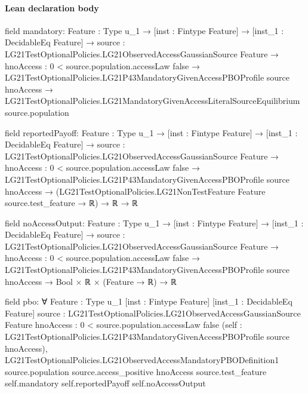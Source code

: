 \documentclass[10pt]{article}
\begin{document}
\paragraph{Lean declaration body}
\begin{ReviewVerbatim}
field mandatory:
{Feature : Type u_1} →
  [inst : Fintype Feature] →
    [inst_1 : DecidableEq Feature] →
      {source : LG21TestOptionalPolicies.LG21ObservedAccessGaussianSource Feature} →
        {hnoAccess : 0 < source.population.accessLaw {false}} →
          LG21TestOptionalPolicies.LG21P43MandatoryGivenAccessPBOProfile source hnoAccess →
            LG21TestOptionalPolicies.LG21MandatoryGivenAccessLiteralSourceEquilibrium source.population

field reportedPayoff:
{Feature : Type u_1} →
  [inst : Fintype Feature] →
    [inst_1 : DecidableEq Feature] →
      {source : LG21TestOptionalPolicies.LG21ObservedAccessGaussianSource Feature} →
        {hnoAccess : 0 < source.population.accessLaw {false}} →
          LG21TestOptionalPolicies.LG21P43MandatoryGivenAccessPBOProfile source hnoAccess →
            (LG21TestOptionalPolicies.LG21NonTestFeature Feature source.test_feature → ℝ) → ℝ → ℝ

field noAccessOutput:
{Feature : Type u_1} →
  [inst : Fintype Feature] →
    [inst_1 : DecidableEq Feature] →
      {source : LG21TestOptionalPolicies.LG21ObservedAccessGaussianSource Feature} →
        {hnoAccess : 0 < source.population.accessLaw {false}} →
          LG21TestOptionalPolicies.LG21P43MandatoryGivenAccessPBOProfile source hnoAccess → Bool × ℝ × (Feature → ℝ) → ℝ

field pbo:
∀ {Feature : Type u_1} [inst : Fintype Feature] [inst_1 : DecidableEq Feature]
  {source : LG21TestOptionalPolicies.LG21ObservedAccessGaussianSource Feature}
  {hnoAccess : 0 < source.population.accessLaw {false}}
  (self : LG21TestOptionalPolicies.LG21P43MandatoryGivenAccessPBOProfile source hnoAccess),
  LG21TestOptionalPolicies.LG21ObservedAccessMandatoryPBODefinition1 source.population source.access_positive hnoAccess
    source.test_feature self.mandatory self.reportedPayoff self.noAccessOutput
\end{ReviewVerbatim}
\end{document}
